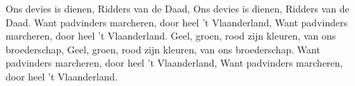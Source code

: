 \beginverse*
Ons devies is dienen, Ridders van de Daad,
Ons devies is dienen, Ridders van de Daad.
Want padvinders marcheren, door heel 't Vlaanderland,
Want padvinders marcheren, door heel 't Vlaanderland.
Geel, groen, rood zijn kleuren, van ons broederschap,
Geel, groen, rood zijn kleuren, van ons broederschap.
Want padvinders marcheren, door heel 't Vlaanderland,
Want padvinders marcheren, door heel 't Vlaanderland.
\endverse
\endsong 